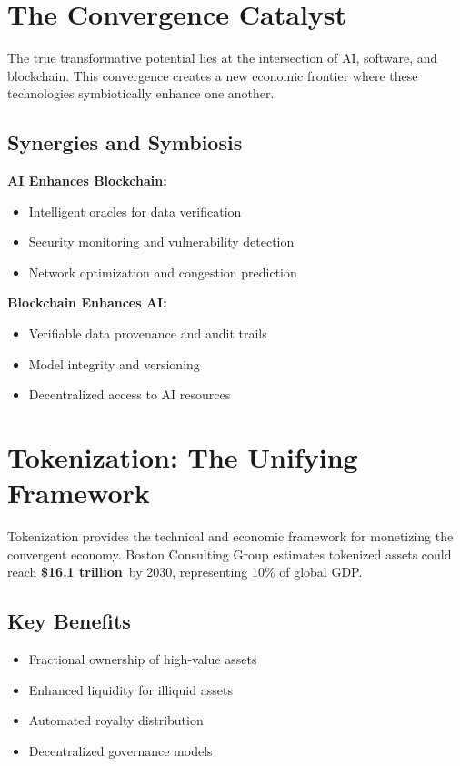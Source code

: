 \documentclass[11pt,a4paper]{report}
\newcommand{\marketvalue}[2]{\textcolor{accentgreen}{\textbf{\$#1}}\,\textcolor{darkgray}{#2}}
\begin{document}
\chapter{The Convergence Catalyst}

The true transformative potential lies at the intersection of AI, software, and blockchain. This convergence creates a new economic frontier where these technologies symbiotically enhance one another.

\section{Synergies and Symbiosis}

\textbf{AI Enhances Blockchain:}
\begin{itemize}
    \item Intelligent oracles for data verification
    \item Security monitoring and vulnerability detection
    \item Network optimization and congestion prediction
\end{itemize}

\textbf{Blockchain Enhances AI:}
\begin{itemize}
    \item Verifiable data provenance and audit trails
    \item Model integrity and versioning
    \item Decentralized access to AI resources
\end{itemize}

\chapter{Tokenization: The Unifying Framework}

Tokenization provides the technical and economic framework for monetizing the convergent economy. Boston Consulting Group estimates tokenized assets could reach \marketvalue{16.1 trillion}{} by 2030, representing 10\% of global GDP.

\section{Key Benefits}
\begin{itemize}
    \item Fractional ownership of high-value assets
    \item Enhanced liquidity for illiquid assets
    \item Automated royalty distribution
    \item Decentralized governance models
\end{itemize}
\end{document}
